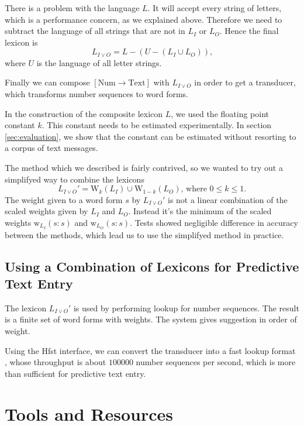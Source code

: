 \documentclass[a4paper,conference]{IEEEtran}
\begin{document}
There is a problem with the language $L$. It will accept every
string of letters, which is a performance concern, as we explained
above. Therefore we need to subtract the language of all strings that
are not in $L_I$ or $L_O$. Hence the final lexicon is
\begin{equation}L_{I\vee O} = L - (U - (L_I \cup L_O))\text{,}\end{equation}
where $U$ is the language of all letter strings.

Finally we can compose $[\mathrm{Num}\rightarrow\mathrm{Text}]$ with
$L_{I\vee O}$ in order to get a transducer, which transforms number
sequences to word forms.

In the construction of the composite lexicon $L$, we used the floating
point constant $k$. This constant needs to be estimated
experimentally. In section \ref{sec:evaluation}, we show that the
constant can be estimated without resorting to a corpus of text messages.

The method which we described is fairly contrived, so we wanted to try
out a simplifyed way to combine the lexicons
\begin{equation}
  L_{I\vee O}' = \mathrm{W}_k(L_I) \cup \mathrm{W}_{1-k}(L_O)\text{, where }0 \leq k \leq 1\text{.}
\end{equation} 
The weight given to a word form $s$ by $L_{I\vee O}'$ is not a linear
combination of the scaled weights given by $L_I$ and $L_O$. Instead
it's the minimum of the scaled weights
$\mathrm{w}_{L_I}(s\mathrm{:}s)$ and $\mathrm{w}_{L_O}(s\mathrm{:}s)$.
Tests showed negligible difference in accuracy between the methods,
which lead us to use the simplifyed method in practice.

\subsection{Using a Combination of Lexicons for Predictive Text Entry}

The lexicon $L_{I\vee O}'$ is used by performing lookup for number
sequences. The result is a finite set of word forms with weights. The
system gives suggestion in order of weight.

Using the Hfst interface, we can convert the transducer into a fast
lookup format \cite{conf/fsmnlp/Silfverberg2009}, whose throughput is
about $100000$ number sequences per second, which is more than
sufficient for predictive text entry.

\section{Tools and Resources}
\label{sec:tools}
\end{document}
